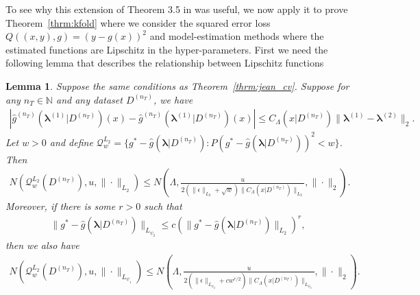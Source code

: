 \documentclass[10pt]{book}
\newtheorem{lemma}{Lemma}
\theoremstyle{definition}
\begin{document}
To see why this extension of Theorem 3.5 in \citet{lecue2012oracle} was useful, we now apply it to prove Theorem~\ref{thrm:kfold} where we consider the squared error loss $Q((x,y), g) = (y - g(x))^2$ and model-estimation methods where the estimated functions are Lipschitz in the hyper-parameters.
First we need the following lemma that describes the relationship between Lipschitz functions
\begin{lemma}
	Suppose the same conditions as Theorem~\ref{thrm:jean_cv}.
	Suppose for any $n_T \in \mathbb{N}$ and any dataset $D^{(n_T)}$, we have
	\begin{align}
	\left |\hat{g}^{(n_T)}(\boldsymbol{\lambda}^{(1)}|D^{(n_T)})(x) - \hat{g}^{(n_T)}(\boldsymbol{\lambda}^{(1)}|D^{(n_T)})(x) \right | \le C_\Lambda(x|D^{(n_T)}) \|\boldsymbol{\lambda}^{(1)} - \boldsymbol{\lambda}^{(2)}\|_2.
	\end{align}
	Let $w > 0$ and define 
	$\mathcal{Q}_{w}^{L_{2}} = \{g^* - \hat{g}(\boldsymbol{\lambda}|D^{(n_{T})}) : P (g^* - \hat{g}(\boldsymbol{\lambda}|D^{(n_{T})}))^2 < w\}$.
	Then
	\begin{align}
	N\left(\mathcal{Q}_{w}^{L_{2}}(D^{(n_{T})}),u,\|\cdot\|_{L_{2}}\right)\le N\left(\Lambda,\frac{u}{2\left(\|\epsilon\|_{L_{2}}+\sqrt{w}\right)
		\|C_\Lambda(x|D^{(n_{T})})\|_{L_{2}}},\|\cdot\|_{2}\right).
	\end{align}
	Moreover, if there is some $r > 0$ such that
	\begin{align}
	\|g^{*}-\hat{g}(\boldsymbol{\lambda}|D^{(n_{T})})\|_{L_{\psi_{2}}}\le c\left(\|g^{*}-\hat{g}(\boldsymbol{\lambda}|D^{(n_{T})})\|_{L_{2}}\right)^{r},
	\end{align}
	then we also have
	\begin{align}
	N\left(\mathcal{Q}_{w}^{L_{2}}(D^{(n_{T})}),u,\|\cdot\|_{L_{\psi_{1}}}\right)\le N\left(\Lambda,\frac{u}{2\left(\|\epsilon\|_{L_{\psi_{2}}}+cw^{r/2}\right)
		\|C_\Lambda(x|D^{(n_{T})})\|_{L_{\psi_{2}}}},\|\cdot\|_{2}\right).
	\end{align}
	\label{lemma:covering_lipschitz}
\end{lemma}
\end{document}
